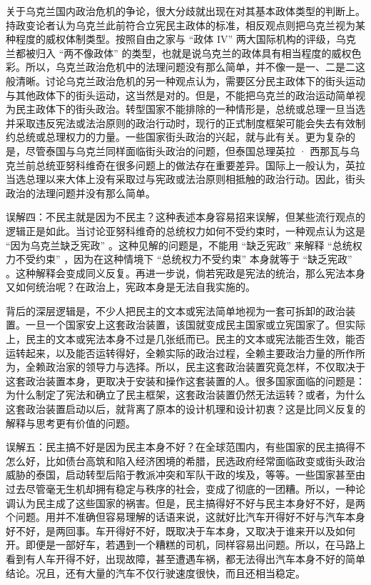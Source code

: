 关于乌克兰国内政治危机的争论，很大分歧就出现在对其基本政体类型的判断上。持政变论者认为乌克兰此前符合立宪民主政体的标准，相反观点则把乌克兰视为某种程度的威权体制类型。按照自由之家与 “政体 IV” 两大国际机构的评级，乌克兰都被归入 “两不像政体” 的类型，也就是说乌克兰的政体具有相当程度的威权色彩。所以，乌克兰政治危机中的法理问题没有那么简单，并不像一是一、二是二这般清晰。讨论乌克兰政治危机的另一种观点认为，需要区分民主政体下的街头运动与其他政体下的街头运动，这当然是对的。但是，不能把乌克兰的政治运动简单视为民主政体下的街头政治。转型国家不能排除的一种情形是，总统或总理一旦当选并采取违反宪法或法治原则的政治行动时，现行的正式制度框架可能会失去有效制约总统或总理权力的力量。一些国家街头政治的兴起，就与此有关。更为复杂的是，尽管泰国与乌克兰同样面临街头政治的问题，但泰国总理英拉 · 西那瓦与乌克兰前总统亚努科维奇在很多问题上的做法存在重要差异。国际上一般认为，英拉当选总理以来大体上没有采取过与宪政或法治原则相抵触的政治行动。因此，街头政治的法理问题并没有那么简单。

误解四：不民主就是因为不民主？这种表述本身容易招来误解，但某些流行观点的逻辑正是如此。当讨论亚努科维奇的总统权力如何不受约束时，一种观点认为这是 “因为乌克兰缺乏宪政” 。这种见解的问题是，不能用 “缺乏宪政” 来解释 “总统权力不受约束” ，因为在这种情境下 “总统权力不受约束” 本身就等于 “缺乏宪政” 。这种解释会变成同义反复。再进一步说，倘若宪政是宪法的统治，那么宪法本身又如何统治呢？在政治上，宪政本身是无法自我实施的。

背后的深层逻辑是，不少人把民主的文本或宪法简单地视为一套可拆卸的政治装置。一旦一个国家安上这套政治装置，该国就变成民主国家或立宪国家了。但实际上，民主的文本或宪法本身不过是几张纸而已。民主的文本或宪法能否生效，能否运转起来，以及能否运转得好，全赖实际的政治过程，全赖主要政治力量的所作所为，全赖政治家的领导力与选择。所以，民主这套政治装置究竟怎样，不仅取决于这套政治装置本身，更取决于安装和操作这套装置的人。很多国家面临的问题是：为什么制定了宪法和确立了民主框架，这套政治装置仍然无法运转？或者，为什么这套政治装置启动以后，就背离了原本的设计机理和设计初衷？这是比同义反复的解释与思考更有价值的问题。

误解五：民主搞不好是因为民主本身不好？在全球范围内，有些国家的民主搞得不怎么好，比如债台高筑和陷入经济困境的希腊，民选政府经常面临政变或街头政治威胁的泰国，启动转型后陷于教派冲突和军队干政的埃及，等等。一些国家甚至由过去尽管毫无生机却拥有稳定与秩序的社会，变成了彻底的一团糟。所以，一种论调认为民主成了这些国家的祸害。但是，民主搞得好不好与民主本身好不好，是两个问题。用并不准确但容易理解的话语来说，这就好比汽车开得好不好与汽车本身好不好，是两回事。车开得好不好，既取决于车本身，又取决于谁来开以及如何开。即便是一部好车，若遇到一个糟糕的司机，同样容易出问题。所以，在马路上看到有人车开得不好，出现故障，甚至遭遇车祸，都无法得出汽车本身不好的简单结论。况且，还有大量的汽车不仅行驶速度很快，而且还相当稳定。

